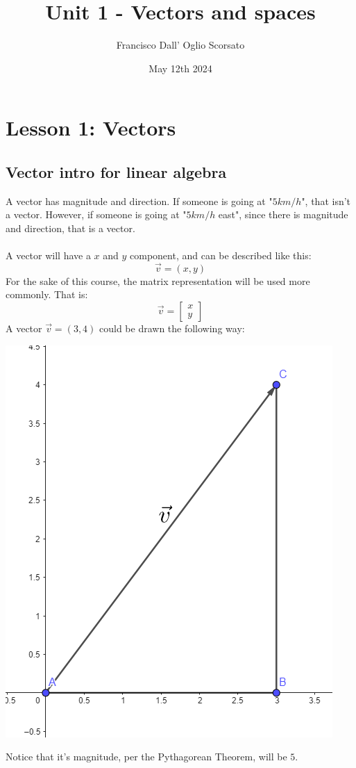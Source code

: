 \documentclass{article}
\title{Unit 1 - Vectors and spaces}
\author{Francisco Dall' Oglio Scorsato}
\date{May 12th 2024}
\begin{document}
\maketitle

\section{Lesson 1: Vectors}

\subsection{Vector intro for linear algebra}

A vector has magnitude and direction. If someone is going at "$5km/h$", that isn't a vector. 
However, if someone is going at "$5km/h$ east", since there is magnitude and direction, that is a vector.\\
\\
A vector will have a $x$ and $y$ component, and can be described like this:
\[\vec{v}=(x,y)\]
For the sake of this course, the matrix representation will be used more commonly. That is:
\[\vec{v}=
    \begin{bmatrix}
     x\\
     y
    \end{bmatrix}\]
A vector $\vec{v}=(3,4)$ could be drawn the following way:\\
\begin{center}
    \includegraphics[scale=0.5]{image 1.png}
\end{center}
Notice that it's magnitude, per the Pythagorean Theorem, will be \(5\). 
\end{document}
